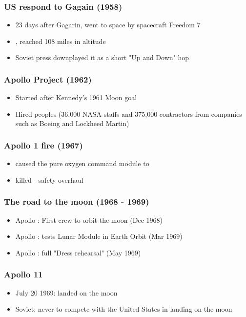 \documentclass[10pt]{article}
\newcommand{\fillin}[1]{\uline{\hspace{#1}}}
\begin{document}
\subsubsection*{US respond to Gagain (1958)}
\begin{itemize}
    \item 23 days after Gagarin, \fillin{4cm} went to space by spacecraft Freedom 7
    \item \fillin{5cm}, reached 108 miles in altitude
    \item Soviet press downplayed it as a short "Up and Down" hop
\end{itemize}

\subsubsection*{Apollo Project (1962)}
\begin{itemize}
    \item Started after Kennedy's 1961 Moon goal
    \item Hired \fillin{4cm} peoples (36,000 NASA staffs and 375,000 contractors from companies such as Boeing and  Lockheed Martin)
\end{itemize}

\subsubsection*{Apollo 1 fire (1967)}
\begin{itemize}
    \item \fillin{5cm} caused the pure oxygen command module to \fillin{3cm}
    \item \fillin{5cm} killed - safety overhaul
\end{itemize}

\subsubsection*{The road to the moon (1968 - 1969)}
\begin{itemize}
    \item Apollo \fillin{1cm}: First crew to orbit the moon (Dec 1968)
    \item Apollo \fillin{1cm}: tests Lunar Module in Earth Orbit (Mar 1969)
    \item Apollo \fillin{1cm}: full "Dress rehearsal" (May 1969)
\end{itemize}

\subsubsection*{Apollo 11}
\begin{itemize}
    \item July 20 1969: \fillin{8cm} landed on the moon
    \item Soviet: never \fillin{3cm} to compete with the United States in landing on the moon
\end{itemize}
\end{document}
